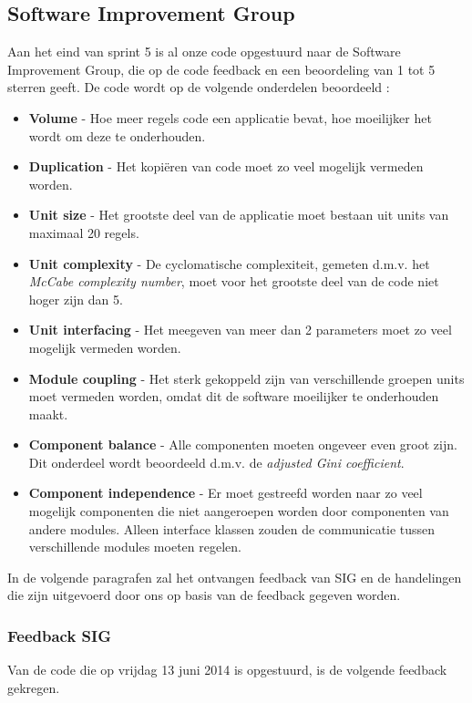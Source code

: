 \subsection{Software Improvement Group}
Aan het eind van sprint 5 is al onze code opgestuurd naar de Software Improvement Group, die op de code feedback en een beoordeling van 1 tot 5 sterren geeft. De code wordt op de volgende onderdelen beoordeeld \cite{sigmanual}:
\begin{itemize}
\item \textbf{Volume} - Hoe meer regels code een applicatie bevat, hoe moeilijker het wordt om deze te onderhouden.
\item \textbf{Duplication} - Het kopi\"eren van code moet zo veel mogelijk vermeden worden.
\item \textbf{Unit size} - Het grootste deel van de applicatie moet bestaan uit units van maximaal 20 regels.
\item \textbf{Unit complexity} - De cyclomatische complexiteit, gemeten d.m.v. het \emph{McCabe complexity number}, moet voor het grootste deel van de code niet hoger zijn dan 5.
\item \textbf{Unit interfacing} - Het meegeven van meer dan 2 parameters moet zo veel mogelijk vermeden worden.
\item \textbf{Module coupling} - Het sterk gekoppeld zijn van verschillende groepen units moet vermeden worden, omdat dit de software moeilijker te onderhouden maakt.
\item \textbf{Component balance} - Alle componenten moeten ongeveer even groot zijn. Dit onderdeel wordt beoordeeld d.m.v. de \emph{adjusted Gini coefficient}.
\item \textbf{Component independence} - Er moet gestreefd worden naar zo veel mogelijk componenten die niet aangeroepen worden door componenten van andere modules. Alleen interface klassen zouden de communicatie tussen verschillende modules moeten regelen.
\end{itemize}

In de volgende paragrafen zal het ontvangen feedback van SIG en de handelingen die zijn uitgevoerd door ons op basis van de feedback gegeven worden.

\subsubsection{Feedback SIG}
Van de code die op vrijdag 13 juni 2014 is opgestuurd, is de volgende feedback gekregen.

